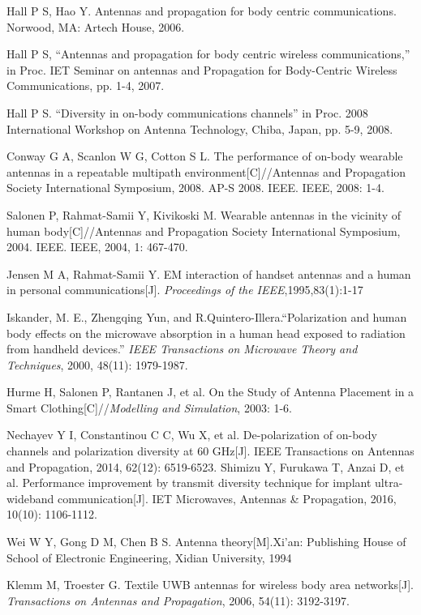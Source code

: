 \documentclass[journal]{IEEEtran}
\begin{document}
\begin{thebibliography}{1}
 Hall P S, Hao Y. Antennas and propagation for body centric communications. Norwood, MA: Artech House, 2006.

 Hall P S,  “Antennas and propagation for body centric wireless communications,” in Proc. IET Seminar on antennas and Propagation for Body-Centric Wireless Communications, pp. 1-4, 2007.

 Hall P S. “Diversity in on-body communications channels” in Proc. 2008 International Workshop on Antenna Technology, Chiba, Japan, pp. 5-9, 2008.

 Conway G A, Scanlon W G, Cotton S L. The performance of on-body wearable antennas in a repeatable multipath environment[C]//Antennas and Propagation Society International Symposium, 2008. AP-S 2008. IEEE. IEEE, 2008: 1-4.

Salonen P, Rahmat-Samii Y, Kivikoski M. Wearable antennas in the vicinity of human body[C]//Antennas and Propagation Society International Symposium, 2004. IEEE. IEEE, 2004, 1: 467-470.

Jensen M A, Rahmat-Samii Y. EM  interaction of handset antennas and a human in personal communications[J]. \emph{Proceedings of the IEEE},1995,83(1):1-17

Iskander, M. E., Zhengqing Yun, and R.Quintero-Illera.``Polarization and human body effects on the microwave absorption in a human head exposed to radiation from handheld devices.''
\emph{IEEE Transactions on Microwave Theory and Techniques}, 2000, 48(11): 1979-1987.

Hurme H, Salonen P, Rantanen J, et al. On the Study of Antenna Placement in a Smart Clothing[C]//\emph{Modelling and Simulation}, 2003: 1-6.

Nechayev Y I, Constantinou C C, Wu X, et al. De-polarization of on-body channels and polarization diversity at 60 GHz[J]. IEEE Transactions on Antennas and Propagation, 2014, 62(12): 6519-6523.
Shimizu Y, Furukawa T, Anzai D, et al. Performance improvement by transmit diversity technique for implant ultra-wideband communication[J]. IET Microwaves, Antennas
\& Propagation, 2016, 10(10): 1106-1112.

Wei W Y, Gong D M, Chen B S. Antenna theory[M].Xi’an: Publishing House of School of Electronic Engineering, Xidian University, 1994

Klemm M, Troester G. Textile UWB antennas for wireless body area networks[J]. \emph{Transactions on Antennas and Propagation}, 2006, 54(11): 3192-3197.


\end{thebibliography}
\end{document}
